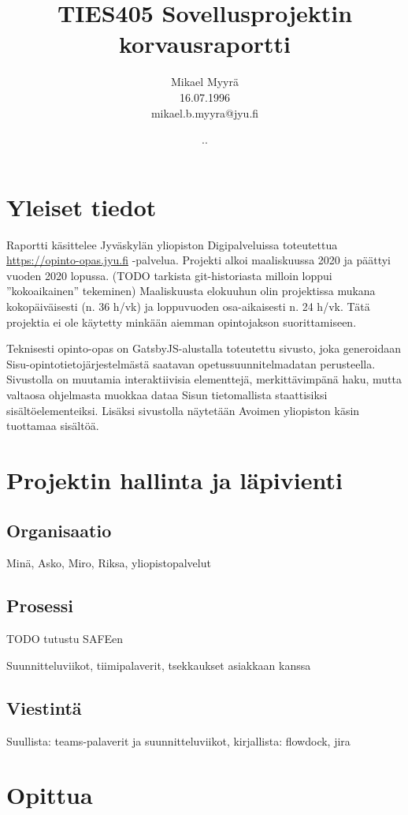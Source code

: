 \documentclass{article}
\title{TIES405 Sovellusprojektin korvausraportti}
\author{
Mikael Myyrä \\
16.07.1996\\
mikael.b.myyra@jyu.fi\\
}
\date{\number\day.\number\month.\number\year}
\begin{document}
\maketitle

\section*{Yleiset tiedot}

Raportti käsittelee Jyväskylän yliopiston Digipalveluissa toteutettua
\url{https://opinto-opas.jyu.fi} -palvelua.
Projekti alkoi maaliskuussa 2020 ja päättyi vuoden 2020 lopussa. (TODO tarkista git-historiasta milloin loppui ''kokoaikainen'' tekeminen)
Maaliskuusta elokuuhun olin projektissa mukana kokopäiväisesti (n. 36 h/vk) ja
loppuvuoden osa-aikaisesti n. 24 h/vk. Tätä projektia ei ole käytetty minkään
aiemman opintojakson suorittamiseen.

Teknisesti opinto-opas on GatsbyJS-alustalla toteutettu sivusto, joka
generoidaan Sisu-opintotieto\-järjestelmästä saatavan opetussuunnitelmadatan
perusteella. Sivustolla on muutamia interaktiivisia elementtejä,
merkittävimpänä haku, mutta valtaosa ohjelmasta muokkaa dataa Sisun
tieto\-mallista staattisiksi sisältöelementeiksi. Lisäksi sivustolla näytetään
Avoimen yliopiston käsin tuottamaa sisältöä.

\section*{Projektin hallinta ja läpivienti}

\subsection*{Organisaatio}

Minä, Asko, Miro, Riksa, yliopistopalvelut

\subsection*{Prosessi}

TODO tutustu SAFEen

Suunnitteluviikot, tiimipalaverit, tsekkaukset asiakkaan kanssa

\subsection*{Viestintä}

Suullista: teams-palaverit ja suunnitteluviikot, kirjallista: flowdock, jira

\section*{Opittua}
\end{document}
